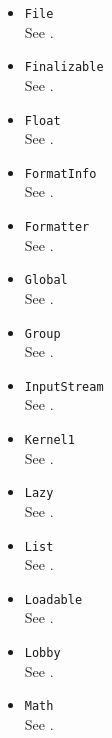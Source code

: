 \begin{itemize}
\item \lstinline|File|\\
  See .

\item \lstinline|Finalizable|\\
  See .

\item \lstinline|Float|\\
  See .

\item \lstinline|FormatInfo|\\
  See .

\item \lstinline|Formatter|\\
  See .

\item \lstinline|Global|\\
  See .

\item \lstinline|Group|\\
  See .

\item \lstinline|InputStream|\\
  See .


\item \lstinline|Kernel1|\\
  See .

\item \lstinline|Lazy|\\
  See .

\item \lstinline|List|\\
  See .

\item \lstinline|Loadable|\\
  See .

\item \lstinline|Lobby|\\
  See .

\item \lstinline|Math|\\
  See .


\end{itemize}
